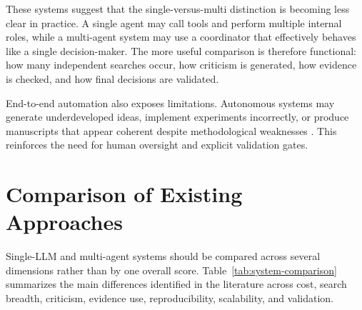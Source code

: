 \documentclass[11pt]{article}
\begin{document}
These systems suggest that the single-versus-multi distinction is becoming less clear in practice. A
single agent may call tools and perform multiple internal roles, while a multi-agent system may use
a coordinator that effectively behaves like a single decision-maker. The more useful comparison is
therefore functional: how many independent searches occur, how criticism is generated, how
evidence is checked, and how final decisions are validated.

End-to-end automation also exposes limitations. Autonomous systems may generate
underdeveloped ideas, implement experiments incorrectly, or produce manuscripts that appear
coherent despite methodological weaknesses \cite{lu2024ai,yamada2026towards}. This reinforces
the need for human oversight and explicit validation gates.

\section{Comparison of Existing Approaches}
\label{sec:comparison}

Single-LLM and multi-agent systems should be compared across several dimensions rather than by
one overall score. Table~\ref{tab:system-comparison} summarizes the main differences identified in
the literature across cost, search breadth, criticism, evidence use, reproducibility, scalability, and
validation.
\end{document}
